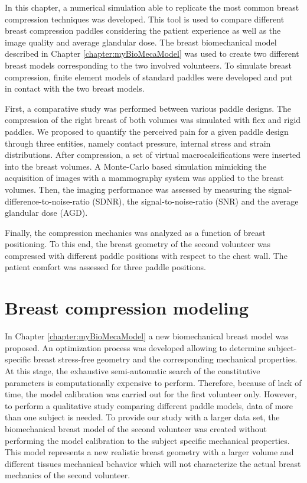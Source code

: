 
In this chapter, a numerical simulation able to replicate the most common breast compression techniques was developed. This tool is used to compare different breast compression paddles considering the patient experience as well as the image quality and average glandular dose. The breast biomechanical model described  in Chapter \ref{chapter:myBioMecaModel} was used to create two different breast models corresponding to the two involved volunteers. To simulate breast compression, finite element models of standard paddles were developed and put in contact with the two breast models.

First, a comparative study was performed between various paddle designs. The compression of the right breast of both volumes was simulated with flex and rigid paddles. We proposed to quantify the perceived pain for a given paddle design through three entities, namely contact pressure, internal stress and strain distributions. After compression, a set of virtual macrocalcifications were inserted into the breast volumes. A Monte-Carlo based simulation mimicking the acquisition of images with a mammography system was applied to the breast volumes. Then, the imaging performance was assessed by measuring the signal-difference-to-noise-ratio (SDNR), the signal-to-noise-ratio (SNR) and the average glandular dose (AGD).

Finally, the compression mechanics was analyzed as a function of breast positioning. To this end, the breast geometry of the second volunteer was compressed with different paddle positions with respect to the chest wall. The patient comfort was assessed for three paddle positions. 

 

\clearpage


\section{Breast compression modeling}
In Chapter \ref{chapter:myBioMecaModel} a new biomechanical breast model was proposed. An optimization process was developed allowing to determine subject-specific breast stress-free geometry and the corresponding mechanical properties. At this stage, the exhaustive semi-automatic search of the constitutive parameters is computationally expensive to perform. Therefore, because of lack of time, the model calibration was carried out for the first volunteer only. However, to perform a qualitative study comparing different paddle models, data of more than one subject is needed. To provide our study with a larger data set, the biomechanical breast model of the second volunteer was created without performing the model calibration to the subject specific mechanical properties. This model represents a new realistic breast geometry with a larger volume and different tissues mechanical behavior which will not characterize the actual breast mechanics of the second volunteer.

